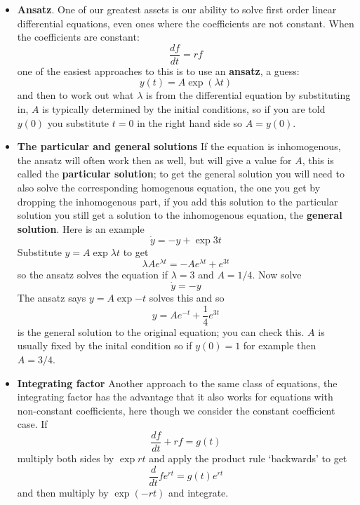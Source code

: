 \documentclass[11pt,a4paper]{scrartcl}
\begin{document}
\begin{itemize}
  
\item \textbf{Ansatz}. One of our greatest assets is our ability to solve first order
  linear differential equations, even ones where the coefficients are
  not constant. When the coefficients are constant:
  \begin{equation}
    \frac{df}{dt}=rf
  \end{equation}
  one of the easiest approaches to this is to use an
  \textbf{ansatz}, a guess:
  \begin{equation}
    y(t)=A\exp{(\lambda{}t)}
  \end{equation}
  and then to work out what $\lambda$ is from the differential
  equation by substituting in, $A$ is typically determined by the
  initial conditions, so if you are told $y(0)$ you substitute $t=0$ in the right hand side so $A=y(0)$.
\item \textbf{The particular and general solutions} If the equation is inhomogenous, the ansatz will often work then as well, but will give a value for $A$, this is called the \textbf{particular solution}; to get the general solution you will need to also solve the corresponding homogenous equation, the one you get by dropping the inhomogenous part, if you add this solution to the particular solution you still get a solution to the inhomogenous equation, the \textbf{general solution}. Here is an example
  \begin{equation}
    \dot{y}=-y+\exp{3t}
  \end{equation}
  Substitute $y=A\exp{\lambda t}$ to get
  \begin{equation}
    \lambda Ae^{\lambda t}=-Ae^{\lambda t}+e^{3t}
  \end{equation}
  so the ansatz solves the equation if $\lambda=3$ and $A=1/4$. Now solve
  \begin{equation}
    \dot{y}=-y
  \end{equation}
  The ansatz says $y=A\exp{-t}$ solves this and so
  \begin{equation}
    y=Ae^{-t}+\frac{1}{4}e^{3t}
  \end{equation}
  is the general solution to the original equation; you can check this. $A$ is usually fixed by the inital condition so if $y(0)=1$ for example then $A=3/4$.
  
\item \textbf{Integrating factor} Another approach to the same class of equations, the integrating factor has the advantage that it also works for equations with non-constant coefficients, here though we consider the constant coefficient case. If
  \begin{equation}
    \frac{df}{dt}+rf=g(t)
  \end{equation}
  multiply both sides by $\exp{rt}$ and apply the product rule `backwards' to get
  \begin{equation}
    \frac{d}{dt}fe^{rt}=g(t)e^{rt}
  \end{equation}
  and then multiply by $\exp{(-rt)}$ and integrate.
  
\end{itemize}
\end{document}
